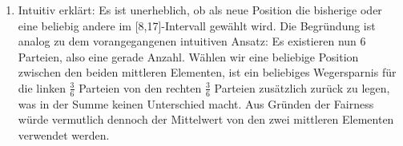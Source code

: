 \documentclass[a4paper]{scrartcl}
\def \blattnr {6}
\begin{document}
\begin{enumerate}[label=\bfseries \blattnr.\arabic*]
\begin{enumerate}
 \item 
 Intuitiv erklärt: Es ist unerheblich, ob als neue Position die bisherige oder eine beliebig andere im [8,17]-Intervall gewählt wird. Die Begründung
 ist analog zu dem vorangegangenen intuitiven Ansatz: Es existieren nun 6 Parteien, also eine gerade Anzahl. 
 Wählen wir eine beliebige Position zwischen den beiden mittleren Elementen, ist ein beliebiges Wegersparnis für die linken $\frac36$ Parteien von den 
 rechten $\frac36$ Parteien zusätzlich zurück zu legen, was in der Summe keinen Unterschied macht. Aus Gründen der Fairness würde vermutlich dennoch der 
 Mittelwert von den zwei mittleren Elementen verwendet werden.
 
\end{enumerate}

\end{enumerate}
\end{document}
